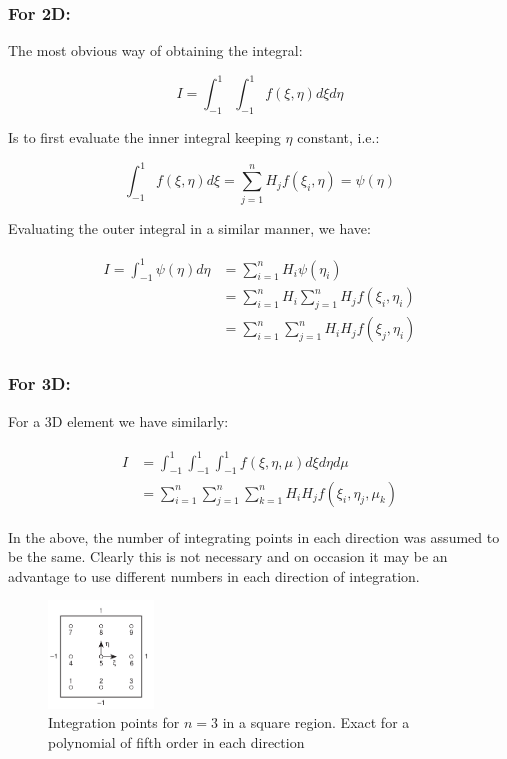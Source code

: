 \documentclass[10pt,b5paper,titlepage]{book}
\newenvironment{eqarray}
{
    \begin{eqnarray}
        \begin{aligned}
}
{
        \end{aligned}
    \end{eqnarray}
}
\begin{document}
\subsubsection{For 2D:}

The most obvious way of obtaining the integral:

\begin{equation}
    I = \int_{-1}^{1} \int_{-1}^{1} f(\xi, \eta) d\xi d\eta
\end{equation}

Is to first evaluate the inner integral keeping $ \eta $ constant, i.e.:

\begin{equation}
    \int_{-1}^{1}f(\xi, \eta) d\xi = \sum_{j=1}^n H_j f(\xi_i, \eta) = \psi(\eta)
\end{equation}

Evaluating the outer integral in a similar manner, we have:

\begin{eqarray}
    I = \int_{-1}^{1} \psi(\eta) d\eta
    &= \sum_{i=1}^n H_i \psi(\eta_i)\\
    &= \sum_{i=1}^n H_i \sum_{j=1}^n H_j f(\xi_i,\eta_i)\\
    &= \sum_{i=1}^n \sum_{j=1}^n H_i H_j f(\xi_j,\eta_i)
\end{eqarray}

\subsubsection{For 3D:}
For a 3D element we have similarly:

\begin{eqarray}
    I &= \int_{-1}^{1} \int_{-1}^{1} \int_{-1}^{1} f(\xi, \eta, \mu) d\xi d\eta d\mu\\
    &= \sum_{i=1}^n \sum_{j=1}^n \sum_{k=1}^n H_i H_j f(\xi_i,\eta_j,\mu_k)
\end{eqarray}

In the above, the number of integrating points in each direction was assumed to be
the same. Clearly this is not necessary and on occasion it may be an advantage to
use different numbers in each direction of integration.

\begin{figure}[ht]
    \centering
    \includegraphics[width=0.25\textwidth]{img/quad_interpolation_3.png}
    \caption{Integration points for $ n = 3 $ in a square region. Exact for a
    polynomial of fifth order in each direction}
    \label{fig:quad-interpolation-3-png}
\end{figure}
\end{document}
